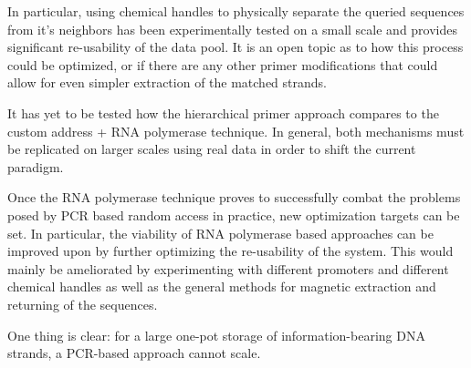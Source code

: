 \documentclass[a4paper,conference]{IEEEtran}
\begin{document}
In particular, using chemical handles to physically separate the queried sequences from it's neighbors has been experimentally tested on a small scale and provides significant re-usability of the data pool. It is an open topic as to how this process could be optimized, or if there are any other primer modifications that could allow for even simpler extraction of the matched strands.

It has yet to be tested how the hierarchical primer approach compares to the custom address + RNA polymerase technique. In general, both mechanisms must be replicated on larger scales using real data in order to shift the current paradigm.

Once the RNA polymerase technique proves to successfully combat the problems posed by PCR based random access in practice, new optimization targets can be set. In particular, the viability of RNA polymerase based approaches can be improved upon by further optimizing the re-usability of the system. This would mainly be ameliorated by experimenting with different promoters and different chemical handles as well as the general methods for magnetic extraction and returning of the sequences. 

One thing is clear: for a large one-pot storage of information-bearing DNA strands, a PCR-based approach cannot scale. 





\end{document}
